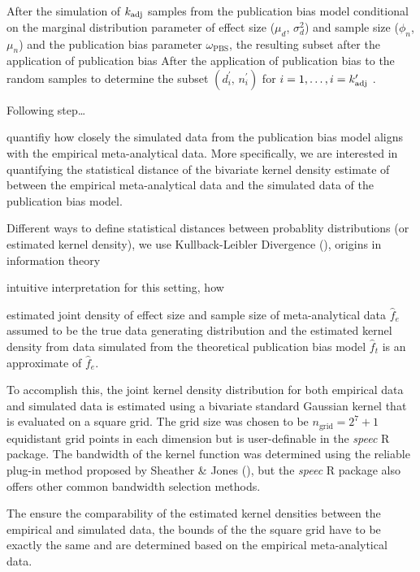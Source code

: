\documentclass[
  12pt,
]{scrartcl}
\newcommand{\pbs}{\omega_{\text{PBS}}}
\begin{document}
After the simulation of \(k_{\small{\text{adj}}}\) samples from the
publication bias model conditional on the marginal distribution
parameter of effect size (\(\mu_d\), \(\sigma^2_d\)) and sample size
(\(\phi_n\), \(\mu_n\)) and the publication bias parameter \(\pbs\), the
resulting subset after the application of publication bias After the
application of publication bias to the random samples to determine the
subset \((d_i^\prime, \,n_i^\prime)\) for
\(i=1, \dots,i=k_{\small{\text{adj}}}^\prime\) .

Following step\ldots{}

quantifiy how closely the simulated data from the publication bias model
aligns with the empirical meta-analytical data. More specifically, we
are interested in quantifying the statistical distance of the bivariate
kernel density estimate of between the empirical meta-analytical data
and the simulated data of the publication bias model.

Different ways to define statistical distances between probablity
distributions (or estimated kernel density), we use Kullback-Leibler
Divergence (), origins in information theory

intuitive interpretation for this setting, how

estimated joint density of effect size and sample size of
meta-analytical data \(\widehat{f}_{e}\) assumed to be the true data
generating distribution and the estimated kernel density from data
simulated from the theoretical publication bias model
\(\widehat{f}_{t}\) is an approximate of \(\widehat{f}_{e}\).

To accomplish this, the joint kernel density distribution for both
empirical data and simulated data is estimated using a bivariate
standard Gaussian kernel that is evaluated on a square grid. The grid
size was chosen to be \(n_{\text{grid}}=2^7+1\) equidistant grid points
in each dimension but is user-definable in the \emph{speec} R package.
The bandwidth of the kernel function was determined using the reliable
plug-in method proposed by Sheather \& Jones
(), but the \emph{speec} R
package also offers other common bandwidth selection methods.

The ensure the comparability of the estimated kernel densities between
the empirical and simulated data, the bounds of the the square grid have
to be exactly the same and are determined based on the empirical
meta-analytical data.
\end{document}
